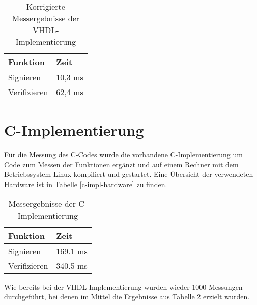 
\begin{table}[h]
	\centering 
	\begin{tabular}{ | p{3cm} | p{6cm} | }
		\hline
		\textbf{Funktion} & \textbf{Zeit} \\
		\hline
		Signieren & 10,3 ms \\
		\hline
		Verifizieren & 62,4 ms \\
		\hline
	\end{tabular}
	\caption{Korrigierte Messergebnisse der VHDL-Implementierung}
	\label{vhdl-messung-2}
\end{table}

\section{C-Implementierung}
Für die Messung des C-Codes wurde die vorhandene C-Implementierung um Code zum Messen der Funktionen ergänzt und auf einem Rechner mit dem Betriebssystem Linux kompiliert und gestartet. Eine Übersicht der verwendeten Hardware ist in Tabelle \ref{c-impl-hardware} zu finden. \\

\begin{table}[h]
	\centering 
	\begin{tabular}{ | p{3cm} | p{6cm} | }
		\hline
		\textbf{Funktion} & \textbf{Zeit} \\
		\hline
		Signieren & 169.1 ms \\
		\hline
		Verifizieren & 340.5 ms \\
		\hline
	\end{tabular}
	\caption{Messergebnisse der C-Implementierung}
	\label{c-messung}
\end{table}

Wie bereits bei der VHDL-Implementierung wurden wieder $1000$ Messungen durchgeführt, bei denen im Mittel die Ergebnisse aus Tabelle \ref{c-messung} erzielt wurden. \\

